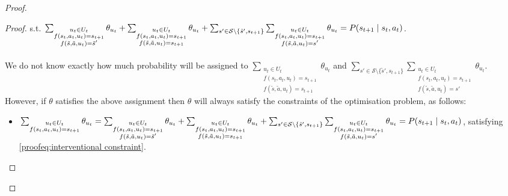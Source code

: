 \begin{proof}
\begin{proof}
    s.t. $\sum_{\substack{u_t \in U_t \\f(s_t, a_t, u_t) = s_{t+1} \\ f(\tilde{s}, \tilde{a}, u_t) = \tilde{s}'}}{\theta_{u_t}} + \sum_{\substack{u_t \in U_t \\f(s_t, a_t, u_t) = s_{t+1} \\ f(\tilde{s}, \tilde{a}, u_t) = s_{t+1}}}{\theta_{u_t}} + \sum_{s' \in \mathcal{S}\setminus\{\tilde{s}', s_{t+1}\}}\sum_{\substack{u_t \in U_t \\f(s_t, a_t, u_t) = s_{t+1} \\ f(\tilde{s}, \tilde{a}, u_t) = s'}}{\theta_{u_t}} \\= P(s_{t+1} \mid s_t, a_t)$.\\\\
    
    We do not know exactly how much probability will be assigned to $\sum_{\substack{u_t \in U_t \\f(s_t, a_t, u_t) = s_{t+1} \\ f(\tilde{s}, \tilde{a}, u_t) = s_{t+1}}}{\theta_{u_t}}$ and $\sum_{s' \in \mathcal{S} \setminus \{\tilde{s}', s_{t+1}\}}\sum_{\substack{u_t \in U_t \\f(s_t, a_t, u_t) = s_{t+1} \\ f(\tilde{s}, \tilde{a}, u_t)= s'}}{\theta_{u_t}}$. However, if $\theta$ satisfies the above assignment then $\theta$ will always satisfy the constraints of the optimisation problem, as follows:

    \begin{itemize}        
    \item $\sum_{\substack{u_t \in U_t \\f(s_t, a_t, u_t) = s_{t+1}}} \theta_{u_t} = \sum_{\substack{u_t \in U_t \\f(s_t, a_t, u_t) = s_{t+1} \\ f(\tilde{s}, \tilde{a}, u_t) = \tilde{s}'}} \theta_{u_t} + \sum_{\substack{u_t \in U_t \\f(s_t, a_t, u_t) = s_{t+1} \\ f(\tilde{s}, \tilde{a}, u_t) = s_{t+1}}} \theta_{u_t} + \sum_{s' \in \mathcal{S}\setminus\{\tilde{s}', s_{t+1}\}}\sum_{\substack{u_t \in U_t \\f(s_t, a_t, u_t) = s_{t+1} \\ f(\tilde{s}, \tilde{a}, u_t) = s'}}{\theta_{u_t}} \\ = P(s_{t+1} \mid s_t, a_t)$, satisfying \eqref{proofeq:interventional constraint}.


\end{itemize}
\end{proof}
\end{proof}
